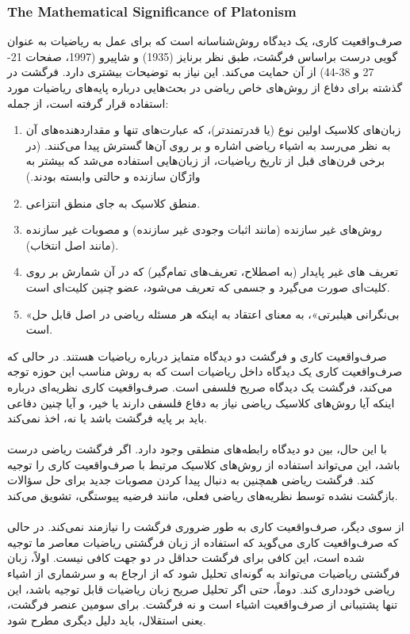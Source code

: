 \documentclass[10pt,a4paper]{article}
\begin{document}
                    \subsubsection{The Mathematical Significance of Platonism}
صرف‌واقعیت کاری، یک دیدگاه روش‌شناسانه است که برای عمل به ریاضیات به عنوان گویی درست براساس فرگشت، طبق نظر برنایز (1935) و شاپیرو (1997، صفحات 21-27 و 38-44) از آن حمایت می‌کند. این نیاز به توضیحات بیشتری دارد. فرگشت در گذشته برای دفاع از روش‌های خاص ریاضی در بحث‌هایی درباره پایه‌های ریاضیات مورد استفاده قرار گرفته است، از جمله:
                        \begin{enumerate}
                            \item زبان‌های کلاسیک اولین نوع (یا قدرتمندتر)، که عبارت‌های تنها و مقداردهنده‌های آن به نظر می‌رسد به اشیاء ریاضی اشاره و بر روی آن‌ها گسترش پیدا می‌کنند. (در برخی قرن‌های قبل از تاریخ ریاضیات، از زبان‌هایی استفاده می‌شد که بیشتر به واژگان سازنده و حالتی وابسته بودند.)
                            \item منطق کلاسیک به جای منطق انتزاعی.
                            \item روش‌های غیر سازنده (مانند اثبات وجودی غیر سازنده) و مصوبات غیر سازنده (مانند اصل انتخاب).
                            \item تعریف ‌های غیر پایدار (به اصطلاح، تعریف‌های تمام‌گیر) که در آن شمارش بر روی کلیت‌ای صورت می‌گیرد و جسمی که تعریف می‌شود، عضو چنین کلیت‌ای است.
                            \item «بی‌نگرانی هیلبرتی»، به معنای اعتقاد به اینکه هر مسئله ریاضی در اصل قابل حل است.
                        \end{enumerate}
صرف‌واقعیت کاری و فرگشت دو دیدگاه متمایز درباره ریاضیات هستند. در حالی که صرف‌واقعیت کاری یک دیدگاه داخل ریاضیات است که به روش مناسب این حوزه توجه می‌کند، فرگشت یک دیدگاه صریح فلسفی است. صرف‌واقعیت کاری نظریه‌ای درباره اینکه آیا روش‌های کلاسیک ریاضی نیاز به دفاع فلسفی دارند یا خیر، و آیا چنین دفاعی باید بر پایه فرگشت باشد یا نه، اخذ نمی‌کند.
                        \\
                        \\
با این حال، بین دو دیدگاه رابطه‌های منطقی وجود دارد. اگر فرگشت ریاضی درست باشد، این می‌تواند استفاده از روش‌های کلاسیک مرتبط با صرف‌واقعیت کاری را توجیه کند. فرگشت ریاضی همچنین به دنبال پیدا کردن مصوبات جدید برای حل سؤالات بازگشت نشده توسط نظریه‌های ریاضی فعلی، مانند فرضیه پیوستگی، تشویق می‌کند.
                        \\
                        \\
                        از سوی دیگر، صرف‌واقعیت کاری به طور ضروری فرگشت را نیازمند نمی‌کند. در حالی که صرف‌واقعیت کاری می‌گوید که استفاده از زبان فرگشتی ریاضیات معاصر ما توجیه شده است، این کافی برای فرگشت حداقل در دو جهت کافی نیست. اولاً، زبان فرگشتی ریاضیات می‌تواند به گونه‌ای تحلیل شود که از ارجاع به و سرشماری از اشیاء ریاضی خودداری کند. دوماً، حتی اگر تحلیل صریح زبان ریاضیات قابل توجیه باشد، این تنها پشتیبانی از صرف‌واقعیت اشیاء است و نه فرگشت. برای سومین عنصر فرگشت، یعنی استقلال، باید دلیل دیگری مطرح شود.\cite{sep-platonism-mathematics}\cite{Benson2006-jm}\cite{Tegmark2008-qv}
\end{document}
